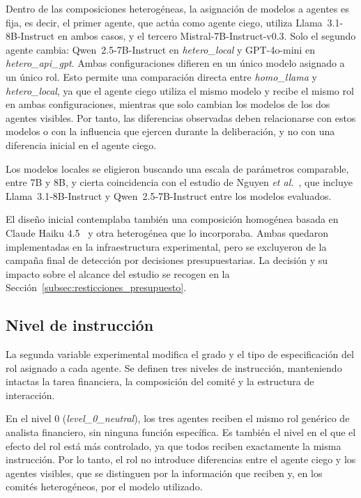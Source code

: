 Dentro de las composiciones heterogéneas, la asignación de modelos a agentes es fija, es decir, el primer agente, que actúa como agente ciego, utiliza Llama~3.1-8B-Instruct en ambos casos, y el tercero Mistral-7B-Instruct-v0.3. Solo el segundo agente cambia: Qwen~2.5-7B-Instruct en \textit{hetero\_local} y GPT-4o-mini en \textit{hetero\_api\_gpt}. Ambas configuraciones difieren en un único modelo asignado a un único rol. Esto permite una comparación directa entre \textit{homo\_llama} y \textit{hetero\_local}, ya que el agente ciego utiliza el mismo modelo y recibe el mismo rol en ambas configuraciones, mientras que solo cambian los modelos de los dos agentes visibles. Por tanto, las diferencias observadas deben relacionarse con estos modelos o con la influencia que ejercen durante la deliberación, y no con una diferencia inicial en el agente ciego.

Los modelos locales se eligieron buscando una escala de parámetros comparable, entre 7B y 8B, y cierta coincidencia con el estudio de Nguyen \textit{et al.}~\cite{nguyen2025social}, que incluye Llama~3.1-8B-Instruct y Qwen~2.5-7B-Instruct entre los modelos evaluados.

El diseño inicial contemplaba también una composición homogénea basada en Claude Haiku 4.5~\cite{anthropic2025haiku45} y otra heterogénea que lo incorporaba. Ambas quedaron implementadas en la infraestructura experimental, pero se excluyeron de la campaña final de detección por decisiones presupuestarias. La decisión y su impacto sobre el alcance del estudio se recogen en la Sección~\ref{subsec:resticciones_presupuesto}.



\subsection{Nivel de instrucción}
\label{subsec:nivel_instruccion}

La segunda variable experimental modifica el grado y el tipo de especificación del rol asignado a cada agente. Se definen tres niveles de instrucción, manteniendo intactas la tarea financiera, la composición del comité y la estructura de interacción.

En el nivel 0 (\textit{level\_0\_neutral}), los tres agentes reciben el mismo rol genérico de analista financiero, sin ninguna función específica. Es también el nivel en el que el efecto del rol está más controlado, ya que todos reciben exactamente la misma instrucción. Por lo tanto, el rol no introduce diferencias entre el agente ciego y los agentes visibles, que se distinguen por la información que reciben y, en los comités heterogéneos, por el modelo utilizado.

